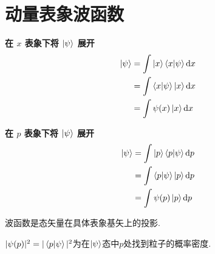 \section{动量表象波函数}
\noindent %
\begin{minipage}[t]{0.48\textwidth}
    \centering
    \textbf{在 $x$ 表象下将 $\ket{\psi}$ 展开}
    \begin{align*}
        \ket{\psi} &= \int \ket{x}\braket{x}{\psi} \dd x \\
        &= \int \braket{x}{\psi} \ket{x} \dd x \\
        &= \int \psi(x)\ket{x} \dd x
    \end{align*}
\end{minipage}
\hfill\vrule\hfill
\begin{minipage}[t]{0.48\textwidth}
    \centering
    \textbf{在 $p$ 表象下将 $\ket{\psi}$ 展开}
    \begin{align*}
        \ket{\psi} &= \int \ket{p}\braket{p}{\psi} \dd p \\
        &= \int \braket{p}{\psi} \ket{p} \dd p \\
        &= \int \psi(p)\ket{p} \dd p
    \end{align*}
\end{minipage}
\vspace{1em}

波函数是态矢量在具体表象基矢上的投影.

$|\psi(p)|^2 = |\braket{p}{\psi}|^2$为在$\ket{\psi}$态中$p$处找到粒子的概率密度.

